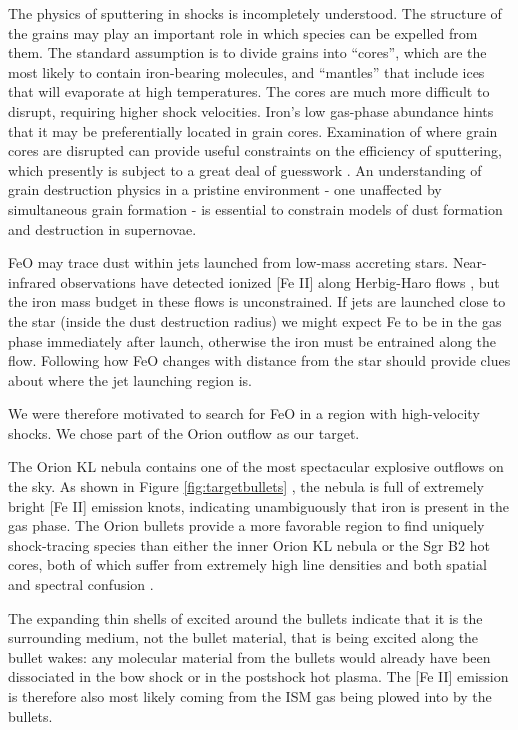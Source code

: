 The physics of sputtering in shocks is incompletely understood.  The
structure of the grains may play an important role in which species can be
expelled from them.  The standard assumption is to divide grains into
``cores'', which are the most likely to contain iron-bearing molecules, and
``mantles'' that include ices that will evaporate at high temperatures.  The
cores are much more difficult to disrupt, requiring higher shock velocities.
Iron's low gas-phase abundance hints that it may be preferentially located in grain
cores.  Examination of where grain cores are disrupted can provide useful
constraints on the efficiency of sputtering, which presently is subject to a
great deal of guesswork \citep{Schilke1997a}.  An understanding of grain
destruction physics in a pristine environment - one unaffected by simultaneous
grain formation - is essential to constrain models of dust formation and
destruction in supernovae.

FeO may trace dust within jets launched from low-mass accreting stars.
Near-infrared observations have detected ionized [Fe II] along Herbig-Haro
flows \citep[e.g. HH 111;][]{Nisini2002a}, but the iron mass budget in these
flows is unconstrained.  If jets are launched close to the star (inside the
dust destruction radius) we might expect Fe to be in the gas phase immediately
after launch, otherwise the iron must be entrained along the flow. Following
how FeO changes with distance from the star should provide clues about where
the jet launching region is.   

We were therefore motivated to search for FeO in a region with high-velocity
shocks.  We chose part of the Orion outflow as our target.


The Orion KL nebula contains one of the most spectacular explosive outflows on
the sky.  As shown in Figure \ref{fig:targetbullets}
\citep{Bally2015a,Bally2017a}, the nebula is full of extremely bright [Fe II]
emission knots, indicating unambiguously that iron is present in the gas phase.  
The Orion bullets provide a more favorable region to find uniquely
shock-tracing species than either the inner Orion KL nebula or the Sgr B2 hot cores,
both of which suffer from extremely high line densities and both spatial and
spectral confusion \citep{Niederhofer2012a,Belloche2013a}.

The expanding thin shells of excited \hh around the bullets indicate that it is
the surrounding medium, not the bullet material, that is being excited along
the bullet wakes: any molecular material from the bullets would already have
been dissociated in the bow shock or in the postshock hot plasma.  The [Fe II]
emission is therefore also most likely coming from the ISM gas being plowed
into by the bullets.  

